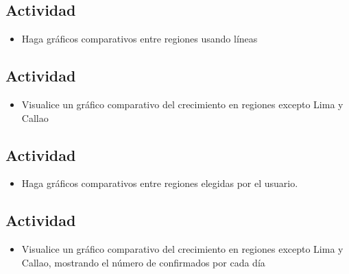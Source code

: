 \documentclass{article}
\begin{document}
         \subsection{Actividad}
        \begin{itemize}	
		\item  Haga gráficos comparativos entre regiones usando líneas
            \end{itemize}
        
         

         \subsection{Actividad}
        \begin{itemize}	
		\item  Visualice un gráfico comparativo del crecimiento en regiones excepto Lima y Callao
            \end{itemize}
         
        

         \subsection{Actividad}
        \begin{itemize}	
		\item  Haga gráficos comparativos entre regiones elegidas por el usuario.
            \end{itemize}
         
         

         \subsection{Actividad}
        \begin{itemize}	
		\item  Visualice un gráfico comparativo del crecimiento en regiones excepto Lima y Callao, mostrando el número de confirmados por cada día
            \end{itemize}
         
         
  \clearpage  
\end{document}
